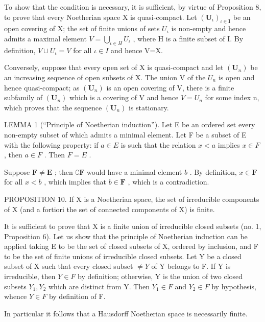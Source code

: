 To show that the condition is necessary, it is sufficient, by virtue of Proposition 8, to prove that every Noetherian space X is quasi-compact. Let \((\mathbf{U}_{\iota})_{\iota\in\mathbf{I}}\) be an open covering of X; the set of finite unions of sets \(U_{\iota}\) is non-empty and hence admits a maximal element \(V=\bigcup_{\iota\in H}U_{\iota}\) , where H is a finite subset of I. By definition, \(V\cup U_{\iota}=V\) for all \(\iota\in I\) and hence V=X.

Conversely, suppose that every open set of X is quasi-compact and let \((\mathbf{U}_{n})\) be an increasing sequence of open subsets of X. The union V of the \(U_{n}\) is open and hence quasi-compact; as \((\mathbf{U}_{n})\) is an open covering of V, there is a finite subfamily of \((\mathbf{U}_{n})\) which is a covering of V and hence \(V = U_{n}\) for some index n, which proves that the sequence \((\mathbf{U}_{n})\) is stationary.

LEMMA 1 (``Principle of Noetherian induction''). Let E be an ordered set every non-empty subset of which admits a minimal element. Let F be a subset of E with the following property: if \(a \in E\) is such that the relation \(x < a\) implies \(x \in F\) , then \(a \in F\) . Then \(F = E\) .

Suppose \(\mathbf{F} \neq \mathbf{E}\) ; then \(\complement\mathbf{F}\) would have a minimal element \(b\) . By definition, \(x \in \mathbf{F}\) for all \(x < b\) , which implies that \(b \in \mathbf{F}\) , which is a contradiction.

PROPOSITION 10. If X is a Noetherian space, the set of irreducible components of X (and a fortiori the set of connected components of X) is finite.

It is sufficient to prove that X is a finite union of irreducible closed subsets (no. 1, Proposition 6). Let us show that the principle of Noetherian induction can be applied taking E to be the set of closed subsets of X, ordered by inclusion, and F to be the set of finite unions of irreducible closed subsets. Let Y be a closed subset of X such that every closed subset \(\neq Y\) of Y belongs to F. If Y is irreducible, then \(Y \in F\) by definition; otherwise, Y is the union of two closed subsets \(Y_{1}, Y_{2}\) which are distinct from Y. Then \(Y_{1} \in F\) and \(Y_{2} \in F\) by hypothesis, whence \(Y \in F\) by definition of F.

In particular it follows that a Hausdorff Noetherian space is necessarily finite.

